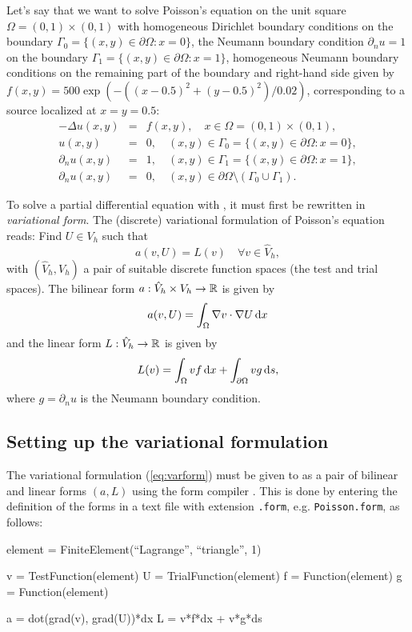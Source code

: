 Let's say that we want to solve Poisson's equation on the unit square
$\Omega = (0,1) \times (0,1)$ with homogeneous Dirichlet boundary
conditions on the boundary $\Gamma_0 = \{(x, y) \in \partial \Omega : x = 0\}$,
the Neumann boundary condition $\partial_n u = 1$ on the boundary $\Gamma_1 = \{(x, y) \in \partial \Omega : x = 1\}$,
homogeneous Neumann boundary conditions on the remaining part of the boundary
and right-hand side given by $f(x, y) = 500 \exp(-((x-0.5)^2 +
(y-0.5)^2)/0.02)$, corresponding to a source localized at $x = y = 0.5$:
\begin{eqnarray} \label{eq:poisson,quickstart}
  - \Delta u(x, y) &=& f(x, y), \quad
  x \in \Omega = (0,1) \times (0,1), \\
  u(x, y) &=& 0, \quad
  (x, y) \in \Gamma_0 = \{(x, y) \in \partial \Omega : x = 0\}, \\
  \partial_n u(x, y) &=& 1, \quad
  (x, y) \in \Gamma_1 = \{(x, y) \in \partial \Omega : x = 1\}, \\
  \partial_n u(x, y) &=& 0, \quad
  (x, y) \in \partial \Omega \setminus (\Gamma_0 \cup \Gamma_1).
\end{eqnarray}

To solve a partial differential equation with \dolfin{}, it must first
be rewritten in \emph{variational form}.  The (discrete) variational
formulation of Poisson's equation reads: Find $U \in V_h$ such that
\begin{equation} \label{eq:varform}
  a(v, U) = L(v) \quad \forall v\in \hat{V}_h, 
\end{equation}
with $(\hat{V}_h, V_h)$ a pair of suitable discrete function spaces
(the test and trial spaces). The bilinear form $a : \hat{V}_h \times V_h
\rightarrow \mathbb{R}$ is given by
\begin{equation}
  a(v, U) = \int_{\Omega} \nabla v \cdot \nabla U \, \mathrm{d}x
\end{equation}
and the linear form $L : \hat{V}_h \rightarrow \mathbb{R}$ is given by
\begin{equation}
  L(v) = \int_{\Omega} v f \, \mathrm{d}x + \int_{\partial \Omega} v g \, \mathrm{d}s,
\end{equation}
where $g = \partial_n u$ is the Neumann boundary condition.

\subsection{Setting up the variational formulation}

The variational formulation (\ref{eq:varform}) must be given to
\dolfin{} as a pair of bilinear and linear forms $(a, L)$ using the
form compiler \ffc{}. This is done by entering the definition of
the forms in a text file with extension \texttt{.form},
e.g. \texttt{Poisson.form}, as follows:
\begin{code}
element = FiniteElement(``Lagrange'', ``triangle'', 1)

v = TestFunction(element)
U = TrialFunction(element)
f = Function(element)
g = Function(element)
  
a = dot(grad(v), grad(U))*dx
L = v*f*dx + v*g*ds
\end{code}


